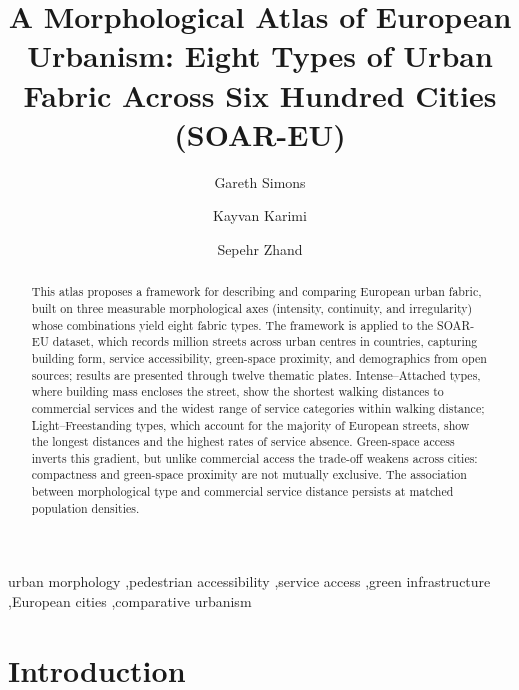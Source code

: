\documentclass[review,authoryear]{elsarticle}
\begin{document}
\begin{frontmatter}

  \title{A Morphological Atlas of European Urbanism: Eight Types of Urban Fabric Across Six Hundred Cities (SOAR-EU)}

  \author[spacesyntax]{Gareth Simons}

  \author[spacesyntax]{Kayvan Karimi}
  \author[spacesyntax]{Sepehr Zhand}


  \begin{abstract}
    This atlas proposes a framework for describing and comparing European urban fabric, built on three measurable morphological axes (intensity, continuity, and irregularity) whose combinations yield eight fabric types. The framework is applied to the SOAR-EU dataset, which records \nTotalM{} million streets across \nCities{} urban centres in \nCountries{} countries, capturing building form, service accessibility, green-space proximity, and demographics from open sources; results are presented through twelve thematic plates.
    Intense--Attached types, where building mass encloses the street, show the shortest walking distances to commercial services and the widest range of service categories within walking distance; Light--Freestanding types, which account for the majority of European streets, show the longest distances and the highest rates of service absence. Green-space access inverts this gradient, but unlike commercial access the trade-off weakens across cities: compactness and green-space proximity are not mutually exclusive. The association between morphological type and commercial service distance persists at matched population densities.
  \end{abstract}

  \begin{keyword}
    urban morphology \sep pedestrian accessibility \sep service access \sep green infrastructure \sep European cities \sep comparative urbanism
  \end{keyword}

\end{frontmatter}

\section{Introduction}
\label{sec:intro}
\end{document}
